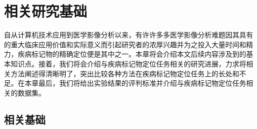 \chapter{相关研究基础}

自从计算机技术应用到医学影像分析以来，有许许多多医学影像分析难题因其具有的重大临床应用价值和实际意义而引起研究者的浓厚兴趣并为之投入大量时间和精力，疾病标记物的精确定位便是其中之一。本章将会介绍本文后续内容涉及到的基本知识点。接着，我们将会介绍与疾病标记物定位任务相关的研究进展，力求将相关方法阐述得清晰明了，突出比较各种方法在疾病标记物定位任务上的长处和不足。在本章最后，我们将给出实验结果的评判标准并介绍与疾病标记物定位任务相关的数据集。

\section{相关基础}

